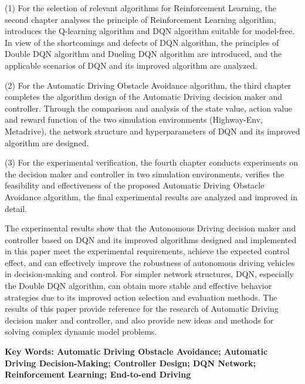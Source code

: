 (1) For the selection of relevant algorithms for Reinforcement Learning, the second chapter analyses the principle of Reinforcement Learning algorithm, introduces the Q-learning algorithm and DQN algorithm suitable for model-free. In view of the shortcomings and defects of DQN algorithm, the principles of Double DQN algorithm and Dueling DQN algorithm are introduced, and the applicable scenarios of DQN and its improved algorithm are analyzed.

(2) For the Automatic Driving Obstacle Avoidance algorithm, the third chapter completes the algorithm design of the Automatic Driving decision maker and controller. Through the comparison and analysis of the state value, action value and reward function of the two simulation environments (Highway-Env, Metadrive), the network structure and hyperparameters of DQN and its improved algorithm are designed. 

(3) For the experimental verification, the fourth chapter conducts experiments on the decision maker and controller in two simulation environments, verifies the feasibility and effectiveness of the proposed Automatic Driving Obstacle Avoidance algorithm, the final experimental results are analyzed and improved in detail.

The experimental results show that the Autonomous Driving decision maker and controller based on DQN and its improved algorithms designed and implemented in this paper meet the experimental requirements, achieve the expected control effect, and can effectively improve the robustness of autonomous driving vehicles in decision-making and control. For simpler network structures, DQN, especially the Double DQN algorithm, can obtain more stable and effective behavior strategies due to its improved action selection and evaluation methods. The results of this paper provide reference for the research of Automatic Driving decision maker and controller, and also provide new ideas and methods for solving complex dynamic model problems.

\vspace{3ex}\noindent\textbf{Key Words: Automatic Driving Obstacle Avoidance; Automatic Driving Decision-Making; Controller Design; DQN Network; Reinforcement Learning; End-to-end Driving}
\newpage
